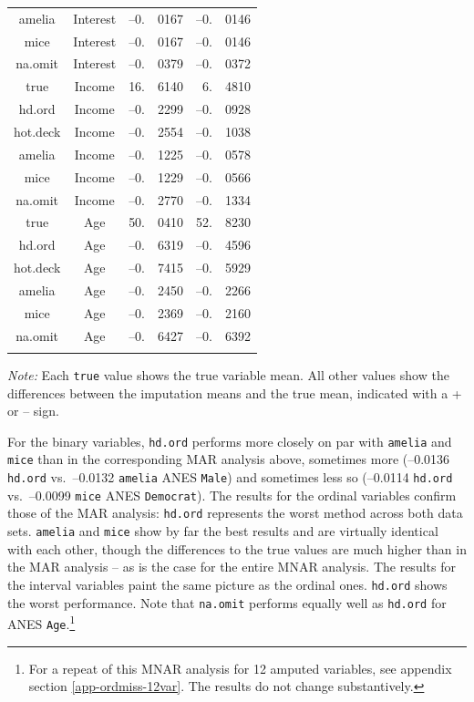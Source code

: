 \documentclass[12pt,econ]{sources/authesis}
\begin{document}
\begin{table}[!htbp]
\begin{threeparttable}
\begin{tabular}{ccr@{}lr@{}l}
 amelia & Interest & --0.&0167 & --0.&0146 \\
 mice & Interest & --0.&0167 & --0.&0146 \\
 na.omit & Interest & --0.&0379 & --0.&0372 \\
 true & Income & 16.&6140 & 6.&4810 \\
 hd.ord & Income & --0.&2299 & --0.&0928 \\ 
 hot.deck & Income & --0.&2554 & --0.&1038 \\
 amelia & Income & --0.&1225 & --0.&0578 \\
 mice & Income & --0.&1229 & --0.&0566 \\
 na.omit & Income & --0.&2770 & --0.&1334 \\
 true & Age & 50.&0410 & 52.&8230 \\
 hd.ord & Age & --0.&6319 & --0.&4596 \\ 
 hot.deck & Age & --0.&7415 & --0.&5929 \\ 
 amelia & Age & --0.&2450 & --0.&2266 \\
 mice & Age & --0.&2369 & --0.&2160 \\ 
 na.omit & Age & --0.&6427 & --0.&6392 \\
 \hline \\[-1.8ex] 
\end{tabular} 
\begin{tablenotes}
\footnotesize{\textit{Note:} Each \texttt{true} value shows the true variable mean. All other values show the differences between the imputation means and the true mean, indicated with a + or -- sign.}
\end{tablenotes}
\end{threeparttable}
\end{table}
For the binary variables, \texttt{hd.ord} performs more closely on par with \texttt{amelia} and \texttt{mice} than in the corresponding MAR analysis above, sometimes more (--0.0136 \texttt{hd.ord} vs.~--0.0132 \texttt{amelia} ANES \texttt{Male}) and sometimes less so (--0.0114 \texttt{hd.ord} vs.~--0.0099 \texttt{mice} ANES \texttt{Democrat}). The results for the ordinal variables confirm those of the MAR analysis: \texttt{hd.ord} represents the worst method across both data sets. \texttt{amelia} and \texttt{mice} show by far the best results and are virtually identical with each other, though the differences to the true values are much higher than in the MAR analysis -- as is the case for the entire MNAR analysis. The results for the interval variables paint the same picture as the ordinal ones. \texttt{hd.ord} shows the worst performance. Note that \texttt{na.omit} performs equally well as \texttt{hd.ord} for ANES \texttt{Age}.\footnote{For a repeat of this MNAR analysis for 12 amputed variables, see appendix section \ref{app-ordmiss-12var}. The results do not change substantively.}
\end{document}
